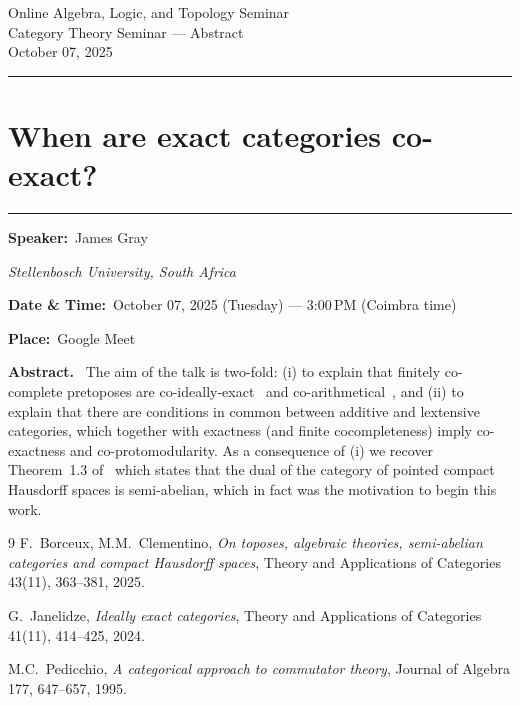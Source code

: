 \documentclass[11pt,a4paper]{article}
\newcommand{\Title}[1]{\section*{#1}\vspace{-0.25em}\hrule\vspace{0.8em}}
\newcommand{\Field}[2]{\textbf{#1:}~#2\par}
\newcommand{\Affil}[1]{\textit{#1}\par}
\newcommand{\Abstract}{\vspace{0.6em}\textbf{Abstract.}~}
\begin{document}
	
	\begin{center}
		{\LARGE Online Algebra, Logic, and Topology Seminar}\\[0.25em]
		{\large Category Theory Seminar — Abstract}\\[0.5em]
		October 07, 2025
	\end{center}
	
	\vspace{1.25em}\hrule\vspace{1.25em}
	
	\Title{When are exact categories co-exact?}
	
	\Field{Speaker}{James Gray}
	\Affil{Stellenbosch University, South Africa}
	
	\Field{Date \& Time}{October 07, 2025 (Tuesday) — 3{:}00\,PM (Coimbra time)}
	\Field{Place}{Google Meet}
	
	\Abstract
	The aim of the talk is two-fold: (i) to explain that finitely co-complete
	pretoposes are co-ideally-exact~\cite{J} and co-arithmetical~\cite{P}, and (ii)
	to explain that there are conditions in common between additive and
	lextensive categories, which together with exactness (and finite
	cocompleteness) imply co-exactness and co-protomodularity. As
	a consequence of (i) we recover Theorem~1.3 of~\cite{BC} which states that
	the dual of the category of pointed compact Hausdorff spaces is
	semi-abelian, which in fact was the motivation to begin this work.
	
	\begin{thebibliography}{9}
		 F.~Borceux, M.M.~Clementino, \emph{On toposes, algebraic theories,
			semi-abelian categories and compact Hausdorff spaces}, Theory and
		Applications of Categories 43(11), 363--381, 2025.
		
		 G.~Janelidze, \emph{Ideally exact categories}, Theory and Applications of
		Categories 41(11), 414--425, 2024.
		
		 M.C.~Pedicchio, \emph{A categorical approach to commutator theory},
		Journal of Algebra 177, 647--657, 1995.
	\end{thebibliography}
	
\end{document}
